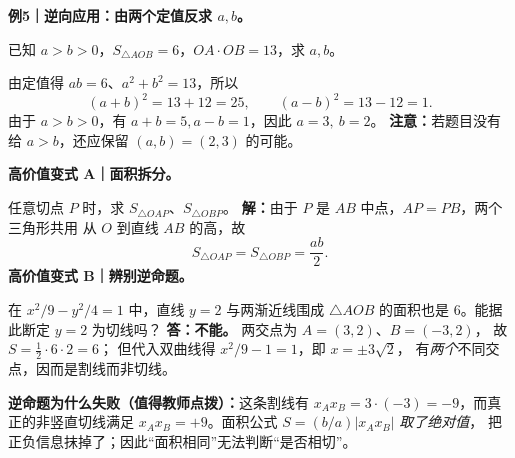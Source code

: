 \begin{examplebox}
\medskip
\textbf{例5｜逆向应用：由两个定值反求 $a,b$。}

已知 $a>b>0$，$S_{\triangle AOB}=6$，$OA\cdot OB=13$，求 $a,b$。

由定值得 $ab=6$、$a^2+b^2=13$，所以
\[
(a+b)^2=13+12=25,\qquad (a-b)^2=13-12=1.
\]
由于 $a>b>0$，有 $a+b=5,a-b=1$，因此
$\boxed{a=3,\ b=2}$。
\textbf{注意：}若题目没有给 $a>b$，还应保留 $(a,b)=(2,3)$ 的可能。

\medskip
\textbf{高价值变式 A｜面积拆分。}

任意切点 $P$ 时，求 $S_{\triangle OAP}$、$S_{\triangle OBP}$。
\textbf{解：}由于 $P$ 是 $AB$ 中点，$AP=PB$，两个三角形共用
从 $O$ 到直线 $AB$ 的高，故
\[
\boxed{S_{\triangle OAP}=S_{\triangle OBP}=\frac{ab}{2}}.
\]
\textbf{高价值变式 B｜辨别逆命题。}

在 $x^2/9-y^2/4=1$ 中，直线 $y=2$ 与两渐近线围成
$\triangle AOB$ 的面积也是 $6$。能据此断定 $y=2$ 为切线吗？
\textbf{答：不能。} 两交点为 $A=(3,2)$、$B=(-3,2)$，
故 $S=\frac12\cdot6\cdot2=6$；
但代入双曲线得 $x^2/9-1=1$，即 $x=\pm3\sqrt2$，
有\emph{两个}不同交点，因而是割线而非切线。

\textbf{逆命题为什么失败（值得教师点拨）：}这条割线有
$x_Ax_B=3\cdot(-3)=-9$，而真正的非竖直切线满足
$x_Ax_B=+9$。面积公式 $S=(b/a)|x_Ax_B|$ \emph{取了绝对值}，
把正负信息抹掉了；因此``面积相同''无法判断``是否相切''。
\end{examplebox}
